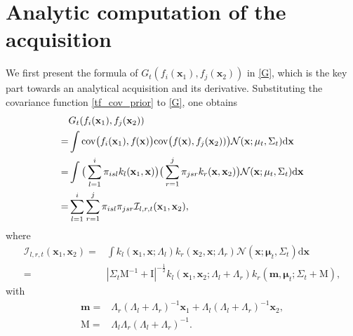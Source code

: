 \documentclass[11pt]{article}
\begin{document}
\section{Analytic computation of the acquisition}
\sloppy We first present the formula of $G_t(f_i(\mathbf{x}_1), f_j(\mathbf{x}_2))$ in \eqref{G}, which is the key part towards an analytical acquisition and its derivative. Substituting the covariance function \eqref{tf_cov_prior} to \eqref{G}, one obtains
\begin{align}
    & G_t(f_i(\mathbf{x}_1), f_j(\mathbf{x}_2))
\nonumber \\
    = &  \int {\rm{cov}}\big(f_i(\mathbf{x}_1), f_{}(\mathbf{x})\big) {\rm{cov}}\big(f_{}(\mathbf{x}), f_j(\mathbf{x}_2))\big) \mathcal{N}(\mathbf{x};\mathbf{\mu}_t, \Sigma_t) \mathrm{d} \mathbf{x}
\nonumber \\
    = &  \int \big(\sum_{l=1}^{i} \pi_{isl} k_l(\mathbf{x}_1, \mathbf{x})\big) \big(\sum_{r=1}^{j} \pi_{jsr} k_r(\mathbf{x}, \mathbf{x}_2) \big) \mathcal{N}(\mathbf{x};\mathbf{\mu}_t, \Sigma_t) \mathrm{d} \mathbf{x}
\nonumber \\ 
    = & \sum_{l=1}^{i} \sum_{r=1}^{j}  \pi_{isl}  \pi_{jsr} \mathcal{I}_{l,r,t}(\mathbf{x}_1, \mathbf{x}_2),
\label{G_t}
\end{align}
where
\begin{subequations}
\begin{align}
    \mathcal{I}_{l,r,t}(\mathbf{x}_1, \mathbf{x}_2) = &
    \int k_l(\mathbf{x}_1, \mathbf{x}; \Lambda_l)  k_r(\mathbf{x}_2, \mathbf{x}; \Lambda_r) 
    \mathcal{N}(\mathbf{x};\mathbf{\mu}_t, \Sigma_t) \mathrm{d} \mathbf{x} 
\label{I1} \\
     = & |\Sigma_t \mathrm{M}^{-1} + \mathrm{I}|^{-\frac{1}{2}}  k_l(\mathbf{x}_1, \mathbf{x}_2;\Lambda_l+\Lambda_r)
    k_r(\mathbf{m},\mathbf{\mu}_t; \Sigma_t+ \mathrm{M}),
\label{I3}
\end{align}
\end{subequations}
with
\begin{align}
    \mathbf{m} = & \Lambda_r(\Lambda_l+\Lambda_r)^{-1}\mathbf{x}_1 + \Lambda_l(\Lambda_l+\Lambda_r)^{-1}\mathbf{x}_2,
\\
    \mathrm{M} = & \Lambda_l \Lambda_r (\Lambda_l + \Lambda_r)^{-1}.
\end{align}
\end{document}
